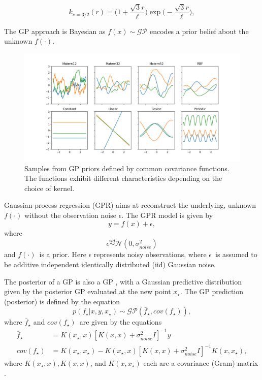 \begin{equation} \label{eq:matern32}
    k_{\nu=3/2}(r) = \Big(1+\frac{\sqrt{3}r}{\ell}\Big)\exp{\Big(-\frac{\sqrt{3}r}{\ell}\Big)},
\end{equation}

The GP approach is Bayesian as \(f(x) \sim \mathcal{GP}\) encodes a prior belief about the unknown $f(\cdot)$.

\begin{figure} [t!]
    \centering
    \includegraphics[width=\textwidth]{figures/gp_kernels}
    \caption[Samples from GP priors defined by common covariance functions]
    {\small Samples from GP priors defined by common covariance functions. 
    The functions exhibit different characteristics depending on the choice of kernel.}
    \label{fig:gp-kernels}
\end{figure}

Gaussian process regression (GPR) aims at reconstruct the underlying, unknown $f(\cdot)$ without the observation noise $\epsilon$.
The GPR model is given by
\begin{equation}
    y = f(x) + \epsilon,
\end{equation}
where
\[\epsilon \overset{iid}{\sim} \mathcal{N}(0, \sigma_{noise}^2)\]
and $f(\cdot)$ is a prior.
Here $\epsilon$ represents noisy observations, where $\epsilon$ is assumed to be additive independent identically distributed (iid) Gaussian noise.

The posterior of a GP is also a GP \cite{Rasmussen2006}, with a Gaussian predictive distribution given by the posterior GP evaluated at the new point $x_\star$.
The GP prediction (posterior) is defined by the equation
\begin{equation}
    p(f_\star|x, y, x_\star) \sim \mathcal{GP}(\bar{f}_\star, cov(f_\star)),
\end{equation}
where $\bar{f}_\star$ and $cov(f_\star)$ are given by the equations
\begin{align}
    \bar{f}_\star &= K(x_\star, x)[K(x, x) + \sigma^2_{noise}I]^{-1}y \\
    cov(f_\star) &= K(x_\star, x_\star) - K(x_\star, x)[K(x, x) + \sigma^2_{noise}I]^{-1}K(x,x_\star),
\end{align}
where $K(x_\star, x), K(x, x)$, and $K(x, x_\star)$ each are a covariance (Gram) matrix \cite{Rasmussen2006}.  

